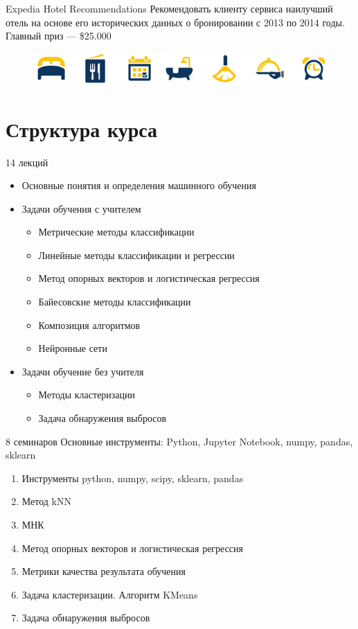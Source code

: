 \documentclass{beamer}
\begin{document}
\begin{frame}{Expedia Hotel Recommendations}
    Рекомендовать клиенту сервиса наилучший отель на основе его исторических данных о бронировании с 2013 по 2014 годы. Главный приз --- \$25.000
    \begin{figure}
        \includegraphics[width=\textwidth]{fig/expedia_icons.png}
    \end{figure}
\end{frame}

\section{Структура курса}
\begin{frame}{14 лекций}
    \begin{itemize}
        \item Основные понятия и определения машинного обучения
        \item Задачи обучения с учителем
        \begin{itemize}
            \item Метрические методы классификации
            \item Линейные методы классификации и регрессии
            \item Метод опорных векторов и логистическая регрессия
            \item Байесовские методы классификации
            \item Композиция алгоритмов
            \item Нейронные сети
        \end{itemize}
        \item Задачи обучение без учителя
        \begin{itemize}
            \item Методы кластеризации
            \item Задача обнаружения выбросов
        \end{itemize}
    \end{itemize}
\end{frame}

\begin{frame}{8 семинаров}
    Основные инструменты: Python, Jupyter Notebook, numpy, pandas, sklearn
    \begin{enumerate}
        \item Инструменты python, numpy, scipy, sklearn, pandas
        \item Метод kNN
        \item МНК
        \item Метод опорных векторов и логистическая регрессия
        \item Метрики качества результата обучения
        \item Задача кластеризации. Алгоритм KMeans
        \item Задача обнаружения выбросов
    \end{enumerate}
\end{frame}
\end{document}
